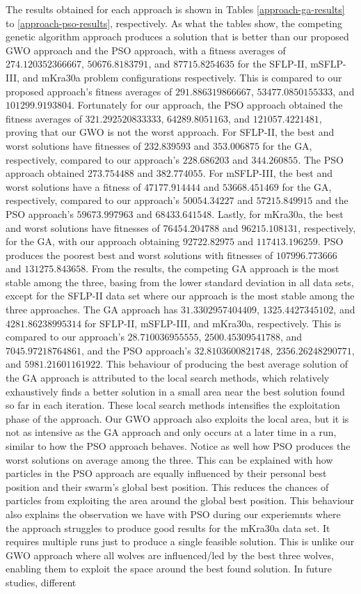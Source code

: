 The results obtained for each approach is shown in Tables \ref{approach-ga-results} to \ref{approach-pso-results}, respectively. As what the tables show, the competing genetic algorithm approach produces a solution that is better than our proposed GWO approach and the PSO approach, with a fitness averages of $274.120352366667$, $50676.8183791$, and $87715.8254635$ for the SFLP-II, mSFLP-III, and mKra30a problem configurations respectively. This is compared to our proposed approach's fitness averages of $291.886319866667$, $53477.0850155333$, and $101299.9193804$. Fortunately for our approach, the PSO approach obtained the fitness averages of $321.292520833333$, $64289.8051163$, and $121057.4221481$, proving that our GWO is not the worst approach. For SFLP-II, the best and worst solutions have fitnesses of $232.839593$ and $353.006875$ for the GA, respectively, compared to our approach's $228.686203$ and $344.260855$. The PSO approach obtained $273.754488$ and $382.774055$. For mSFLP-III, the best and worst solutions have a fitness of $47177.914444$ and $53668.451469$ for the GA, respectively, compared to our approach's $50054.34227$ and $57215.849915$ and the PSO approach's $59673.997963$ and $68433.641548$. Lastly, for mKra30a, the best and worst solutions have fitnesses of $76454.204788$ and $96215.108131$, respectively, for the GA, with our approach obtaining $92722.82975$ and $117413.196259$. PSO produces the poorest best and worst solutions with fitnesses of $107996.773666$ and $131275.843658$. From the results, the competing GA approach is the most stable among the three, basing from the lower standard deviation in all data sets, except for the SFLP-II data set where our approach is the most stable among the three approaches. The GA approach has $31.3302957404409$, $1325.4427345102$, and $4281.86238995314$ for SFLP-II, mSFLP-III, and mKra30a, respectively. This is compared to our approach's $28.710036955555$, $2500.45309541788$, and $7045.97218764861$, and the PSO approach's $32.8103600821748$, $2356.26248290771$, and $5981.21601161922$. This behaviour of producing the best average solution of the GA approach is attributed to the local search methods, which relatively exhaustively finds a better solution in a small area near the best solution found so far in each iteration. These local search methods intensifies the exploitation phase of the approach. Our GWO approach also exploits the local area, but it is not as intensive as the GA approach and only occurs at a later time in a run, similar to how the PSO approach behaves. Notice as well how PSO produces the worst solutions on average among the three. This can be explained with how particles in the PSO approach are equally influenced by their personal best position and their swarm's global best position. This reduces the chances of particles from exploiting the area around the global best position. This behaviour also explains the observation we have with PSO during our experiemnts where the approach struggles to produce good results for the mKra30a data set. It requires multiple runs just to produce a single feasible solution. This is unlike our GWO approach where all wolves are influenced/led by the best three wolves, enabling them to exploit the space around the best found solution. In future studies, different 